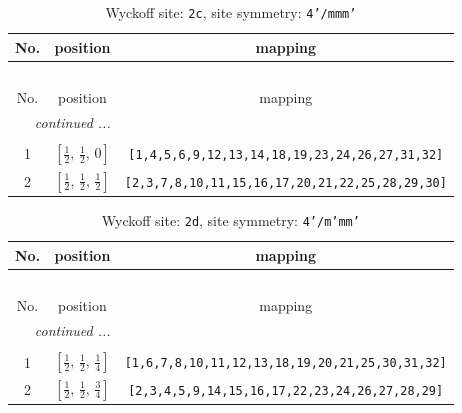 \documentclass[fleqn,8pt]{jsarticle}
\begin{document}
\renewcommand{\arraystretch}{1.2}
\begin{longtable}{ccc}
\caption{Wyckoff site: {\tt 2c}, site symmetry: {\tt 4'/mmm'}}
 \\
 \hline \hline
No. & position & mapping \\ \hline \endfirsthead

\multicolumn{2}{l}{\tablename\ \thetable{}} \\
 \hline \hline
No. & position & mapping \\ \hline \endhead

 \hline \hline
\multicolumn{2}{r}{\footnotesize\it continued ...} \\ \endfoot

 \hline \hline
\multicolumn{2}{r}{} \\ \endlastfoot

1 & $\left[ \frac{1}{2},\, \frac{1}{2},\, 0 \right]$ & {\tt [1,4,5,6,9,12,13,14,18,19,23,24,26,27,31,32]} \\ \hline
2 & $\left[ \frac{1}{2},\, \frac{1}{2},\, \frac{1}{2} \right]$ & {\tt [2,3,7,8,10,11,15,16,17,20,21,22,25,28,29,30]} \\
\end{longtable}
\renewcommand{\arraystretch}{1.2}
\begin{longtable}{ccc}
\caption{Wyckoff site: {\tt 2d}, site symmetry: {\tt 4'/m'mm'}}
 \\
 \hline \hline
No. & position & mapping \\ \hline \endfirsthead

\multicolumn{2}{l}{\tablename\ \thetable{}} \\
 \hline \hline
No. & position & mapping \\ \hline \endhead

 \hline \hline
\multicolumn{2}{r}{\footnotesize\it continued ...} \\ \endfoot

 \hline \hline
\multicolumn{2}{r}{} \\ \endlastfoot

1 & $\left[ \frac{1}{2},\, \frac{1}{2},\, \frac{1}{4} \right]$ & {\tt [1,6,7,8,10,11,12,13,18,19,20,21,25,30,31,32]} \\ \hline
2 & $\left[ \frac{1}{2},\, \frac{1}{2},\, \frac{3}{4} \right]$ & {\tt [2,3,4,5,9,14,15,16,17,22,23,24,26,27,28,29]} \\
\end{longtable}
\renewcommand{\arraystretch}{1.2}
\end{document}
